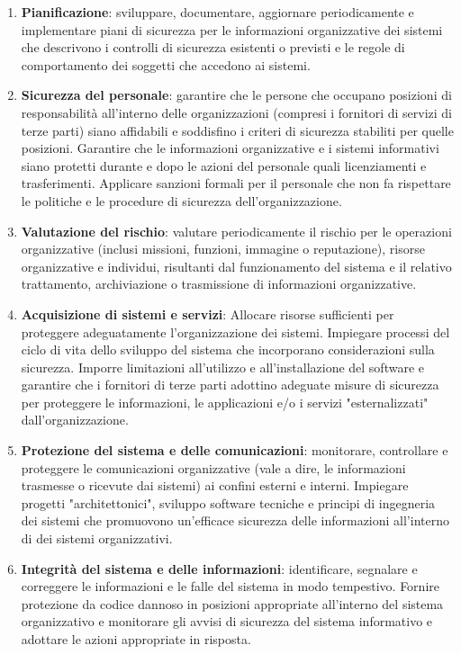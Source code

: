 \begin{enumerate}
    \item \textbf{Pianificazione}: sviluppare, documentare, aggiornare periodicamente e implementare piani di sicurezza per le informazioni organizzative dei sistemi che descrivono i controlli di sicurezza esistenti o previsti e le regole di comportamento dei soggetti che accedono ai sistemi.
    \item \textbf{Sicurezza del personale}: garantire che le persone che occupano posizioni di responsabilità all'interno delle organizzazioni (compresi i fornitori di servizi di terze parti) siano affidabili e soddisfino i criteri di sicurezza stabiliti per quelle posizioni. Garantire che le informazioni organizzative e i sistemi informativi siano protetti durante e dopo le azioni del personale quali licenziamenti e trasferimenti. Applicare sanzioni formali per il personale che non fa rispettare le politiche e le procedure di sicurezza dell'organizzazione.
    \item \textbf{Valutazione del rischio}: valutare periodicamente il rischio per le operazioni organizzative (inclusi missioni, funzioni, immagine o reputazione), risorse organizzative e individui, risultanti dal funzionamento del sistema e il relativo trattamento, archiviazione o trasmissione di informazioni organizzative.
    \item \textbf{Acquisizione di sistemi e servizi}: Allocare risorse sufficienti per proteggere adeguatamente l'organizzazione dei sistemi. Impiegare processi del ciclo di vita dello sviluppo del sistema che incorporano considerazioni sulla sicurezza. Imporre limitazioni all'utilizzo e all'installazione del software e garantire che i fornitori di terze parti adottino adeguate misure di sicurezza per proteggere le informazioni, le applicazioni e/o i servizi "esternalizzati" dall'organizzazione.
    \item \textbf{Protezione del sistema e delle comunicazioni}: monitorare, controllare e proteggere le comunicazioni organizzative (vale a dire, le informazioni trasmesse o ricevute dai sistemi) ai confini esterni e interni. Impiegare progetti "architettonici", sviluppo software tecniche e principi di ingegneria dei sistemi che promuovono un'efficace sicurezza delle informazioni all'interno di dei sistemi organizzativi.
    \item \textbf{Integrità del sistema e delle informazioni}: identificare, segnalare e correggere le informazioni e le falle del sistema in modo tempestivo. Fornire protezione da codice dannoso in posizioni appropriate all'interno del sistema organizzativo e monitorare gli avvisi di sicurezza del sistema informativo e adottare le azioni appropriate in risposta.
\end{enumerate}